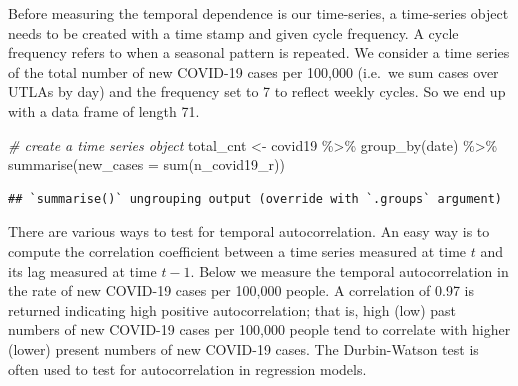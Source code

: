 \documentclass[
]{book}
\newenvironment{Shaded}{\begin{snugshade}}{\end{snugshade}}
\newcommand{\AttributeTok}[1]{\textcolor[rgb]{0.77,0.63,0.00}{#1}}
\newcommand{\CommentTok}[1]{\textcolor[rgb]{0.56,0.35,0.01}{\textit{#1}}}
\newcommand{\DecValTok}[1]{\textcolor[rgb]{0.00,0.00,0.81}{#1}}
\newcommand{\FunctionTok}[1]{\textcolor[rgb]{0.00,0.00,0.00}{#1}}
\newcommand{\NormalTok}[1]{#1}
\newcommand{\OtherTok}[1]{\textcolor[rgb]{0.56,0.35,0.01}{#1}}
\newcommand{\SpecialCharTok}[1]{\textcolor[rgb]{0.00,0.00,0.00}{#1}}
\begin{document}
Before measuring the temporal dependence is our time-series, a time-series object needs to be created with a time stamp and given cycle frequency. A cycle frequency refers to when a seasonal pattern is repeated. We consider a time series of the total number of new COVID-19 cases per 100,000 (i.e.~we sum cases over UTLAs by day) and the frequency set to 7 to reflect weekly cycles. So we end up with a data frame of length 71.

\begin{Shaded}
\begin{Highlighting}[]
\CommentTok{\# create a time series object}
\NormalTok{total\_cnt }\OtherTok{\textless{}{-}}\NormalTok{ covid19 }\SpecialCharTok{\%\textgreater{}\%} \FunctionTok{group\_by}\NormalTok{(date) }\SpecialCharTok{\%\textgreater{}\%}
  \FunctionTok{summarise}\NormalTok{(}\AttributeTok{new\_cases =} \FunctionTok{sum}\NormalTok{(n\_covid19\_r)) }
\end{Highlighting}
\end{Shaded}

\begin{verbatim}
## `summarise()` ungrouping output (override with `.groups` argument)
\end{verbatim}

\begin{Shaded}
\end{Shaded}

There are various ways to test for temporal autocorrelation. An easy way is to compute the correlation coefficient between a time series measured at time \(t\) and its lag measured at time \(t-1\). Below we measure the temporal autocorrelation in the rate of new COVID-19 cases per 100,000 people. A correlation of 0.97 is returned indicating high positive autocorrelation; that is, high (low) past numbers of new COVID-19 cases per 100,000 people tend to correlate with higher (lower) present numbers of new COVID-19 cases. The Durbin-Watson test is often used to test for autocorrelation in regression models.

\begin{Shaded}
\end{Shaded}
\end{document}
